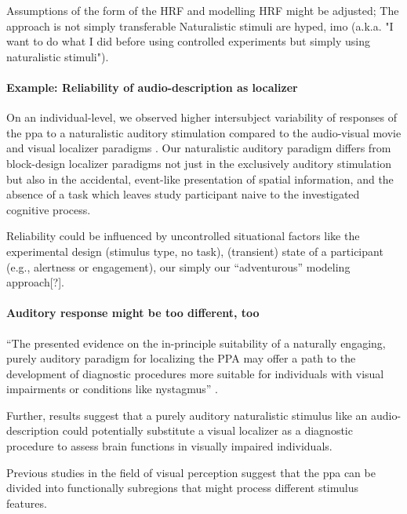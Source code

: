 %
Assumptions of the form of the HRF and modelling HRF  might be adjusted;
%
The approach is not simply transferable
%
Naturalistic stimuli are hyped, imo (a.k.a. "I want to do what I did before
using controlled experiments but simply using naturalistic stimuli").




\paragraph{Example: Reliability of audio-description as localizer}



On an individual-level, we observed higher intersubject variability of responses
of the \ac{ppa} to a naturalistic auditory stimulation compared to the
audio-visual movie and visual localizer paradigms \citep[cf. Table 3
in][]{sengupta2016extension}.
Our naturalistic auditory paradigm differs from block-design localizer paradigms
not just in the exclusively auditory stimulation but also in the accidental,
event-like presentation of spatial information, and the absence of a task which
leaves study participant naive to the investigated cognitive process.

%
Reliability could be influenced by uncontrolled situational factors like the
experimental design (stimulus type, no task), (transient) state of a participant
(e.g., alertness or engagement),  our simply our ``adventurous'' modeling
approach[?].


\paragraph{Auditory response might be too different, too}

%
``The presented evidence on the in-principle suitability of a naturally
engaging, purely auditory paradigm for localizing the PPA may offer a path to
the development of diagnostic procedures more suitable for individuals with
visual impairments or conditions like nystagmus''
\citep{haeusler2022processing}.


Further, results suggest that a purely auditory naturalistic stimulus like an
audio-description could potentially substitute a visual localizer as a
diagnostic procedure to assess brain functions in visually impaired individuals.

Previous studies in the field of visual perception suggest that the \ac{ppa} can
be divided into functionally subregions that might process different stimulus
features.

